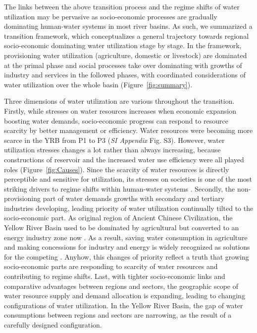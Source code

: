 \documentclass[9pt, twocolumn, twoside, lineno]{pnas-new}
\begin{document}
The links between the above transition process and the regime shifts of water utilization may be pervasive as socio-economic processes are gradually dominating human-water systems in most river basins.
As such, we summarized a transition framework, which conceptualizes a general trajectory towards regional socio-economic dominating water utilization stage by stage.
In the framework, provisioning water utilization (agriculture, domestic or livestock) are dominated at the primal phase and social processes take over dominating with growths of industry and services in the followed phases, with coordinated considerations of water utilization over the whole basin (Figure~\ref{fig:summary}).

Three dimensions of water utilization are various throughout the transition. 
Firstly, while stresses on water resources increases when economic expansion boosting water demands, socio-economic progress can respond to resource scarcity by better management or efficiency. Water resources were becoming more scarce in the YRB from P1 to P3 (\textit{SI Appendix} Fig. S3). However, water utilization stresses changes a lot rather than always increasing, because constructions of reservoir and the increased water use efficiency were all played roles (Figure~\ref{fig:Causes}). Since the scarcity of water resources is directly perceptible and sensitive for utilization, its stresses on societies is one of the most striking drivers to regime shifts within human-water systems \cite{qinFlexibilityIntensityGlobal2019}.
Secondly, the non-provisioning part of water demands growths with secondary and tertiary industries developing, leading priority of water utilization continually tilted to the socio-economic part. As original region of Ancient Chinese Civilization, the Yellow River Basin used to be dominated by agricultural but converted to an energy industry zone now \cite{WillEnergyBases}. 
As a result, saving water consumption in agriculture and making concessions for industry and energy is widely recognized as solutions for the competing \cite{xiangWillEnergyIndustry2016,bebbWaterRightsTransfers2011}. Anyhow, this changes of priority reflect a truth that growing socio-economic parts are responding to scarcity of water resources and contributing to regime shifts.
Last, with tighter socio-economic links and comparative advantages between regions and sectors, the geographic scope of water resource supply and demand allocation is expanding, leading to changing configurations of water utilization. In the Yellow River Basin, the gap of water consumptions between regions and sectors are narrowing, as the result of a carefully designed configuration.
\end{document}
